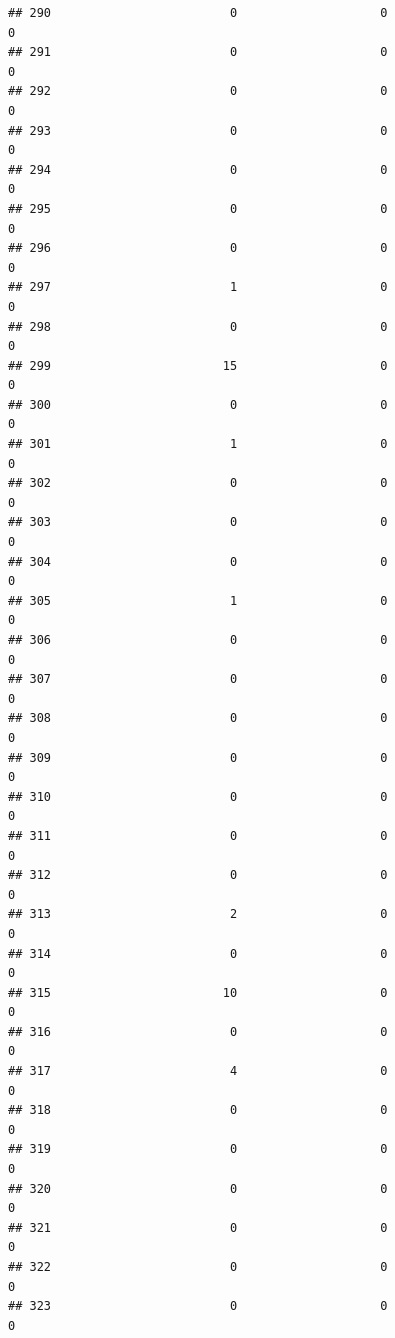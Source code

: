 \documentclass[
]{article}
\begin{document}
\begin{verbatim}
## 290                         0                    0                      0
## 291                         0                    0                      0
## 292                         0                    0                      0
## 293                         0                    0                      0
## 294                         0                    0                      0
## 295                         0                    0                      0
## 296                         0                    0                      0
## 297                         1                    0                      0
## 298                         0                    0                      0
## 299                        15                    0                      0
## 300                         0                    0                      0
## 301                         1                    0                      0
## 302                         0                    0                      0
## 303                         0                    0                      0
## 304                         0                    0                      0
## 305                         1                    0                      0
## 306                         0                    0                      0
## 307                         0                    0                      0
## 308                         0                    0                      0
## 309                         0                    0                      0
## 310                         0                    0                      0
## 311                         0                    0                      0
## 312                         0                    0                      0
## 313                         2                    0                      0
## 314                         0                    0                      0
## 315                        10                    0                      0
## 316                         0                    0                      0
## 317                         4                    0                      0
## 318                         0                    0                      0
## 319                         0                    0                      0
## 320                         0                    0                      0
## 321                         0                    0                      0
## 322                         0                    0                      0
## 323                         0                    0                      0

\end{verbatim}
\end{document}
